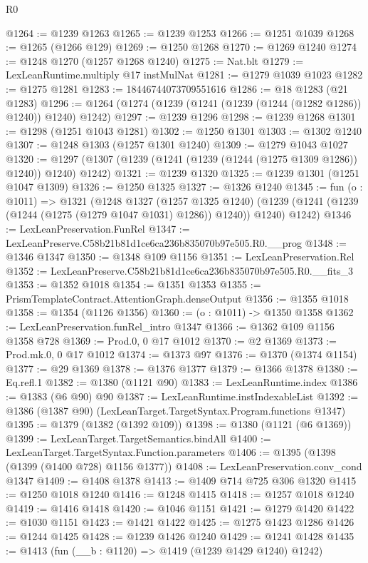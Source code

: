 \begin{lexlean}{R0}
\begin{coremodule}
@1264 := @1239 @1263
@1265 := @1239 @1253
@1266 := @1251 @1039
@1268 := @1265 (@1266 @129)
@1269 := @1250 @1268
@1270 := @1269 @1240
@1274 := @1248 @1270 (@1257 @1268 @1240)
@1275 := Nat.blt
@1279 := LexLeanRuntime.multiply @17 instMulNat
@1281 := @1279 @1039 @1023
@1282 := @1275 @1281
@1283 := 18446744073709551616
@1286 := @18 @1283 (@21 @1283)
@1296 := @1264 (@1274 (@1239 (@1241 (@1239 (@1244 (@1282 @1286)) @1240)) @1240) @1242)
@1297 := @1239 @1296
@1298 := @1239 @1268
@1301 := @1298 (@1251 @1043 @1281)
@1302 := @1250 @1301
@1303 := @1302 @1240
@1307 := @1248 @1303 (@1257 @1301 @1240)
@1309 := @1279 @1043 @1027
@1320 := @1297 (@1307 (@1239 (@1241 (@1239 (@1244 (@1275 @1309 @1286)) @1240)) @1240) @1242)
@1321 := @1239 @1320
@1325 := @1239 @1301 (@1251 @1047 @1309)
@1326 := @1250 @1325
@1327 := @1326 @1240
@1345 := fun (o : @1011) =>
  @1321
    (@1248
      @1327
      (@1257 @1325 @1240)
      (@1239 (@1241 (@1239 (@1244 (@1275 (@1279 @1047 @1031) @1286)) @1240)) @1240)
      @1242)
@1346 := LexLeanPreservation.FunRel
@1347 := LexLeanPreserve.C58b21b81d1ce6ca236b835070b97e505.R0.__prog
@1348 := @1346 @1347
@1350 := @1348 @109 @1156
@1351 := LexLeanPreservation.Rel
@1352 := LexLeanPreserve.C58b21b81d1ce6ca236b835070b97e505.R0.__fits_3
@1353 := @1352 @1018
@1354 := @1351 @1353
@1355 := PrismTemplateContract.AttentionGraph.denseOutput
@1356 := @1355 @1018
@1358 := @1354 (@1126 @1356)
@1360 := (o : @1011) -> @1350 @1358
@1362 := LexLeanPreservation.funRel_intro @1347
@1366 := @1362 @109 @1156 @1358 @728
@1369 := Prod.{0, 0} @17 @1012
@1370 := @2 @1369
@1373 := Prod.mk.{0, 0} @17 @1012
@1374 := @1373 @97
@1376 := @1370 (@1374 @1154)
@1377 := @29 @1369
@1378 := @1376 @1377
@1379 := @1366 @1378
@1380 := Eq.refl.{1}
@1382 := @1380 (@1121 @90)
@1383 := LexLeanRuntime.index
@1386 := @1383 (@6 @90) @90
@1387 := LexLeanRuntime.instIndexableList
@1392 := @1386 (@1387 @90) (LexLeanTarget.TargetSyntax.Program.functions @1347)
@1395 := @1379 (@1382 (@1392 @109))
@1398 := @1380 (@1121 (@6 @1369))
@1399 := LexLeanTarget.TargetSemantics.bindAll
@1400 := LexLeanTarget.TargetSyntax.Function.parameters
@1406 := @1395 (@1398 (@1399 (@1400 @728) @1156 @1377))
@1408 := LexLeanPreservation.conv_cond @1347
@1409 := @1408 @1378
@1413 := @1409 @714 @725 @306 @1320
@1415 := @1250 @1018 @1240
@1416 := @1248 @1415
@1418 := @1257 @1018 @1240
@1419 := @1416 @1418
@1420 := @1046 @1151
@1421 := @1279 @1420
@1422 := @1030 @1151
@1423 := @1421 @1422
@1425 := @1275 @1423 @1286
@1426 := @1244 @1425
@1428 := @1239 @1426 @1240
@1429 := @1241 @1428
@1435 := @1413 (fun (__b : @1120) => @1419 (@1239 @1429 @1240) @1242)

\end{coremodule}
\end{lexlean}
